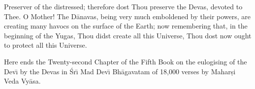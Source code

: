 Preserver of the distressed; therefore dost Thou preserve the Devas, devoted to Thee. O Mother! The D\=anavas, being very much emboldened by their powers, are creating many havocs on the surface of the Earth; now remembering that, in the beginning of the Yugas, Thou didst create all this Universe, Thou dost now ought to protect all this Universe.

Here ends the Twenty-second Chapter of the Fifth Book on the eulogising of the Dev\={\i} by the Devas in \'Sr\={\i} Mad Dev\={\i} Bh\=agavatam of 18,000 verses by Mahar\d{s}i Veda Vy\=asa.



